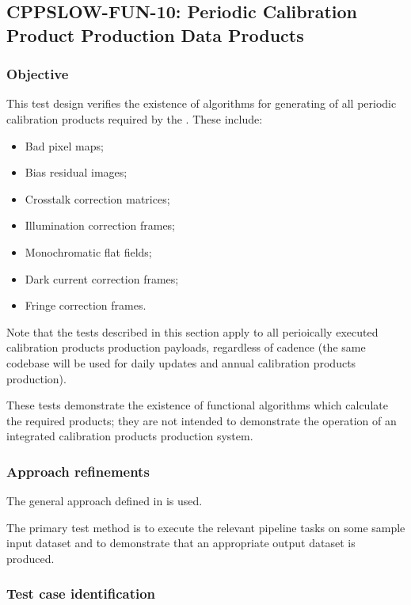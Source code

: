 \subsection{CPPSLOW-FUN-10: Periodic Calibration Product Production Data Products}
\label{cppslow-fun-10}

\subsubsection{Objective}

This test design verifies the existence of algorithms for generating of all
periodic calibration products required by the . These include:

\begin{itemize}

  \item{Bad pixel maps;}
  \item{Bias residual images;}
  \item{Crosstalk correction matrices;}
  \item{Illumination correction frames;}
  \item{Monochromatic flat fields;}
  \item{Dark current correction frames;}
  \item{Fringe correction frames.}

\end{itemize}

Note that the tests described in this section apply to all perioically
executed calibration products production payloads, regardless of cadence (the
same codebase will be used for daily updates and annual calibration products
production).

These tests demonstrate the existence of functional algorithms which calculate
the required products; they are not intended to demonstrate the operation of
an integrated calibration products production system.

\subsubsection{Approach refinements}

The general approach defined in  is used.

The primary test method is to execute the relevant pipeline tasks on some
sample input dataset and to demonstrate that an appropriate output dataset is
produced.

\subsubsection{Test case identification}

